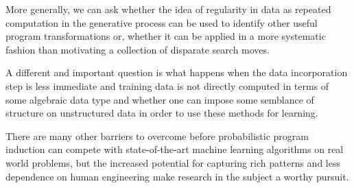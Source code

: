\documentclass[a4paper,10pt]{article}
\begin{document}
More generally, we can ask whether the idea of regularity in data as repeated computation in the generative process can be used to identify other useful program transformations or, whether it can be applied in a more systematic fashion than motivating a collection of disparate search moves.  

A different and important question is what happens when the data incorporation step is less immediate and training data is not directly computed in terms of some algebraic data type and whether one can impose some semblance of structure on unstructured data in order to use these methods for learning.  

There are many other barriers to overcome before probabilistic program induction can compete with state-of-the-art machine learning algorithms on real world problems, but the increased potential for capturing rich patterns and less dependence on human engineering make research in the subject a worthy pursuit.

\newpage


\end{document}
